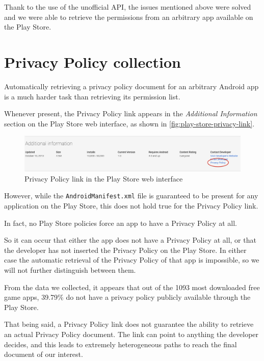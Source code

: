 Thank to the use of the unofficial API, the issues mentioned above were solved and we were able to retrieve the permissions from an arbitrary app available on the Play Store.

\section{Privacy Policy collection}
\label{sec:pp-collection}
Automatically retrieving a privacy policy document for an arbitrary Android app is a much harder task than retrieving its permission list.

Whenever present, the Privacy Policy link appears in the \emph{Additional Information} section on the Play Store web interface, as shown in \autoref{fig:play-store-privacy-link}.

\begin{figure}[tb]
\centering
     \includegraphics[width=\textwidth]{images/play-store-privacy-link}
      \caption{Privacy Policy link in the Play Store web interface}
      \label{fig:play-store-privacy-link}
\end{figure}

However, while the \texttt{AndroidManifest.xml} file is guaranteed to be present for any application on the Play Store, this does not hold true for the Privacy Policy link. 

In fact, no Play Store policies force an app to have a Privacy Policy at all.

So it can occur that either the app does not have a Privacy Policy at all, or that the developer has not inserted the Privacy Policy on the Play Store. In either case the automatic retrieval of the Privacy Policy of that app is impossible, so we will not further distinguish between them.

From the data we collected, it appears that out of the 1093 most downloaded free game apps, 39.79\% do not have a privacy policy publicly available through the Play Store.


That being said, a Privacy Policy link does not guarantee the ability to retrieve an actual Privacy Policy document. The link can point to anything the developer decides, and this leads to extremely heterogeneous paths to reach the final document of our interest.

